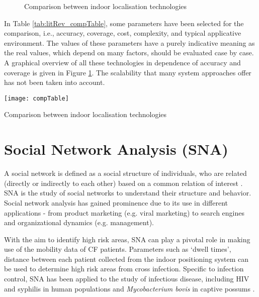              \begin{figure}[htpb!]
             \centering
             \caption{Comparison between indoor localisation technologies \cite{mainetti2014Indoorlit}}
             \label{fig:litRev_compFig}
             \end{figure}
            
In Table \ref{tab:litRev_compTable}, some parameters have been selected for the comparison, i.e., accuracy, coverage, cost, complexity, and typical applicative environment. The values of these parameters have a purely indicative meaning as the real values, which depend on many factors, should be evaluated case by case. A graphical overview of all these technologies in dependence of accuracy and coverage is given in Figure \ref{fig:litRev_compFig}. The scalability that many system approaches offer has not been taken into account.

	\begin{table}[htpb!]
		\centering
        \texttt{[image: compTable]}
        \caption{Comparison between indoor localisation technologies \cite{mainetti2014Indoorlit}}
        \label{tab:litRev_compTable}
	\end{table}

    \section{Social Network Analysis (SNA)} \label{sec:litRev_social}    
    
        
        A social network is defined as a social structure of individuals, who are related (directly or indirectly to each other) based on a common relation of interest \cite{sri2008SocialNEt}. SNA is the study of social networks to understand their structure and behavior. Social network analysis has gained prominence due to its use in different applications - from product marketing (e.g. viral marketing) to search engines and organizational dynamics (e.g. management). 
        
        With the aim to identify high risk areas, SNA can play a pivotal role in making use of the mobility data of CF patients. Parameters such as `dwell times', distance between each patient collected from the indoor positioning system can be used to determine high risk areas from cross infection. Specific to infection control, SNA has been applied to the study of infectious disease, including HIV and syphilis in human populations and \textit{Mycobacterium bovis} in captive possums \cite{christley2005infection}. 
     
